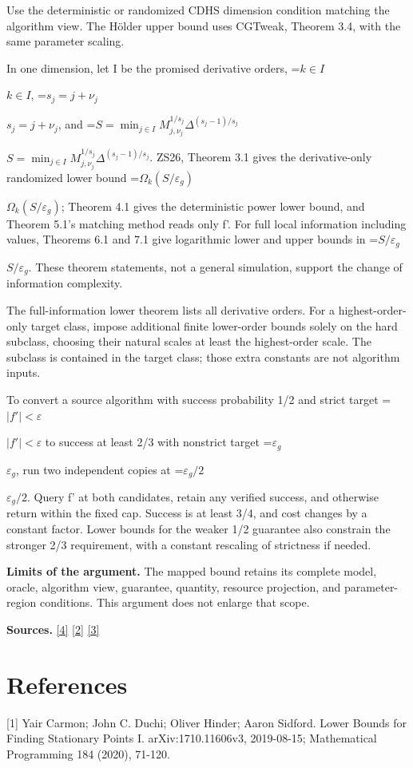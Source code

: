 \documentclass[10pt,a4paper]{article}
\newcommand{\AtlasMath}[1]{\par\begingroup\centering\setbox0=\hbox{$\displaystyle #1$}\ifdim\wd0>1.4\linewidth\typeout{ATLAS WIDE FORMULA: \the\wd0}\fi\ifdim\wd0>\linewidth\resizebox{\linewidth}{!}{\box0}\else\box0\fi\par\endgroup}
\newcommand{\AtlasInlineMath}[1]{\begingroup\setbox0=\hbox{$#1$}\ifdim\wd0>.4\linewidth\endgroup\AtlasMath{#1}\else\endgroup$#1$\fi}
\begin{document}
Use the deterministic or randomized CDHS dimension condition matching the algorithm view. The Hölder upper bound uses CGTweak, Theorem 3.4, with the same parameter scaling.

In one dimension, let I be the promised derivative orders, \AtlasInlineMath{k\in I}, \AtlasInlineMath{s_j=j+\nu_j}, and \AtlasInlineMath{S=\min_{j\in I}M_{j,\nu_j}^{1/s_j}\Delta^{(s_j-1)/s_j}}. ZS26, Theorem 3.1 gives the derivative-only randomized lower bound \AtlasInlineMath{\Omega_k(S/\varepsilon_g)}; Theorem 4.1 gives the deterministic power lower bound, and Theorem 5.1's matching method reads only f'. For full local information including values, Theorems 6.1 and 7.1 give logarithmic lower and upper bounds in \AtlasInlineMath{S/\varepsilon_g}. These theorem statements, not a general simulation, support the change of information complexity.

The full-information lower theorem lists all derivative orders. For a highest-order-only target class, impose additional finite lower-order bounds solely on the hard subclass, choosing their natural scales at least the highest-order scale. The subclass is contained in the target class; those extra constants are not algorithm inputs.

To convert a source algorithm with success probability 1/2 and strict target \AtlasInlineMath{|f'|<\varepsilon} to success at least 2/3 with nonstrict target \AtlasInlineMath{\varepsilon_g}, run two independent copies at \AtlasInlineMath{\varepsilon_g/2}. Query f' at both candidates, retain any verified success, and otherwise return within the fixed cap. Success is at least 3/4, and cost changes by a constant factor. Lower bounds for the weaker 1/2 guarantee also constrain the stronger 2/3 requirement, with a constant rescaling of strictness if needed.

\textbf{Limits of the argument.} The mapped bound retains its complete model, oracle, algorithm view, guarantee, quantity, resource projection, and parameter-region conditions. This argument does not enlarge that scope.

\textbf{Sources.} \href{https://arxiv.org/abs/1710.11606v3}{[4]} \href{https://arxiv.org/abs/1811.01220}{[2]} \href{https://arxiv.org/abs/2610.16295}{[3]}

\section{References}
[1] Yair Carmon; John C. Duchi; Oliver Hinder; Aaron Sidford. Lower Bounds for Finding Stationary Points I. arXiv:1710.11606v3, 2019-08-15; Mathematical Programming 184 (2020), 71-120.
\end{document}
